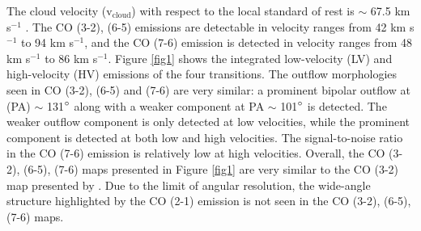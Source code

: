 The cloud velocity (v$_{\mathrm{cloud}}$) with respect to the local standard of rest is $\sim$ 67.5 km s$^{-1}$ \citep{2003A&A...412..175K}. The CO (3-2), (6-5) emissions are detectable in velocity ranges from 42 km s$^{-1}$ to 94 km s$^{-1}$, and the CO (7-6) emission is detected in velocity ranges from 48 km s$^{-1}$ to 86 km s$^{-1}$. Figure \ref{fig1} shows the integrated low-velocity (LV) and high-velocity (HV) emissions of the four transitions. The outflow morphologies seen in CO (3-2), (6-5) and (7-6) are very similar: a prominent bipolar outflow at (PA) $\sim$ 131${\mbox{$^\circ$}}$ along with a weaker component at PA $\sim$ 101${\mbox{$^\circ$}}$ is detected. The weaker outflow component is only detected at low velocities, while the prominent component is detected at both low and high velocities. The signal-to-noise ratio in the CO (7-6) emission is relatively low at high velocities. Overall, the CO (3-2), (6-5), (7-6) maps presented in Figure \ref{fig1} are very similar to the CO (3-2) map presented by \citet{2003A&A...412..175K}. Due to the limit of angular resolution, the wide-angle structure highlighted by the CO (2-1) emission is not seen in the CO (3-2), (6-5), (7-6) maps.


